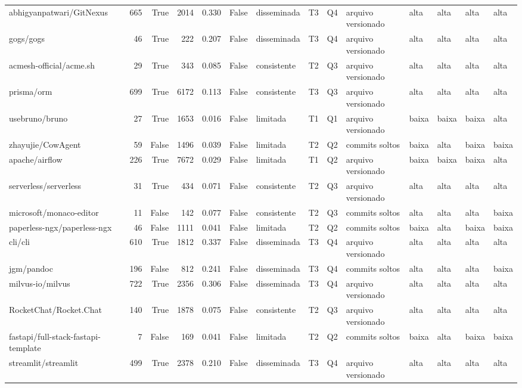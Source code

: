 \begin{tabular}{lrrrrrllllllll}
abhigyanpatwari/GitNexus & 665 & True & 2014 & 0.330 & False & disseminada & T3 & Q4 & arquivo versionado & alta & alta & alta & alta \\
gogs/gogs & 46 & True & 222 & 0.207 & False & disseminada & T3 & Q4 & arquivo versionado & alta & alta & alta & alta \\
acmesh-official/acme.sh & 29 & True & 343 & 0.085 & False & consistente & T2 & Q3 & arquivo versionado & alta & alta & alta & alta \\
prisma/orm & 699 & True & 6172 & 0.113 & False & consistente & T3 & Q3 & arquivo versionado & alta & alta & alta & alta \\
usebruno/bruno & 27 & True & 1653 & 0.016 & False & limitada & T1 & Q1 & arquivo versionado & baixa & baixa & baixa & alta \\
zhayujie/CowAgent & 59 & False & 1496 & 0.039 & False & limitada & T2 & Q2 & commits soltos & baixa & alta & baixa & baixa \\
apache/airflow & 226 & True & 7672 & 0.029 & False & limitada & T1 & Q2 & arquivo versionado & baixa & baixa & baixa & alta \\
serverless/serverless & 31 & True & 434 & 0.071 & False & consistente & T2 & Q3 & arquivo versionado & alta & alta & alta & alta \\
microsoft/monaco-editor & 11 & False & 142 & 0.077 & False & consistente & T2 & Q3 & commits soltos & alta & alta & alta & baixa \\
paperless-ngx/paperless-ngx & 46 & False & 1111 & 0.041 & False & limitada & T2 & Q2 & commits soltos & baixa & alta & baixa & baixa \\
cli/cli & 610 & True & 1812 & 0.337 & False & disseminada & T3 & Q4 & arquivo versionado & alta & alta & alta & alta \\
jgm/pandoc & 196 & False & 812 & 0.241 & False & disseminada & T3 & Q4 & commits soltos & alta & alta & alta & baixa \\
milvus-io/milvus & 722 & True & 2356 & 0.306 & False & disseminada & T3 & Q4 & arquivo versionado & alta & alta & alta & alta \\
RocketChat/Rocket.Chat & 140 & True & 1878 & 0.075 & False & consistente & T2 & Q3 & arquivo versionado & alta & alta & alta & alta \\
fastapi/full-stack-fastapi-template & 7 & False & 169 & 0.041 & False & limitada & T2 & Q2 & commits soltos & baixa & alta & baixa & baixa \\
streamlit/streamlit & 499 & True & 2378 & 0.210 & False & disseminada & T3 & Q4 & arquivo versionado & alta & alta & alta & alta \\

\end{tabular}
